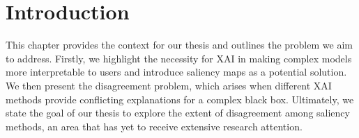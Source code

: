 \chapter{Introduction}
\label{ch:introduction}
This chapter provides the context for our thesis and outlines the problem we aim to address. Firstly, we highlight the necessity for XAI in making complex models more interpretable to users and introduce saliency maps as a potential solution. We then present the disagreement problem, which arises when different XAI methods provide conflicting explanations for a complex black box. Ultimately, we state the goal of our thesis to explore the extent of disagreement among saliency methods, an area that has yet to receive extensive research attention.





% 
